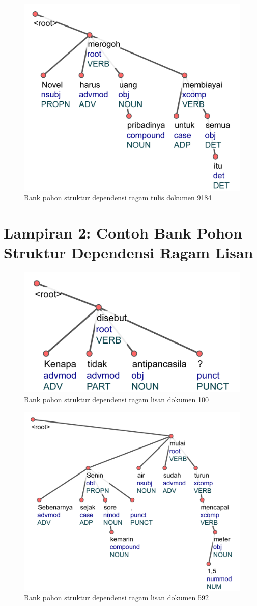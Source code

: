 \begin{figure}
	\centering \includegraphics[width=0.5
	\textwidth] {pics/lampiran/lampirants9184.jpg} 
	\caption{Bank pohon struktur dependensi ragam tulis dokumen 9184} 
	\label{fig:lampirants9184} 
\end{figure}


\chapter*{Lampiran 2: Contoh Bank Pohon Struktur Dependensi Ragam Lisan}

\begin{figure}
	\centering \includegraphics[width=0.4
	\textwidth] {pics/lampiran/lampiranls100.jpg} 
	\caption{Bank pohon struktur dependensi ragam lisan dokumen 100} 
	\label{fig:lampiranls100} 
\end{figure}

\begin{figure}
	\centering \includegraphics[width=0.6
	\textwidth] {pics/lampiran/lampiranls592.jpg} 
	\caption{Bank pohon struktur dependensi ragam lisan dokumen 592} 
	\label{fig:lampiranls592} 
\end{figure}

